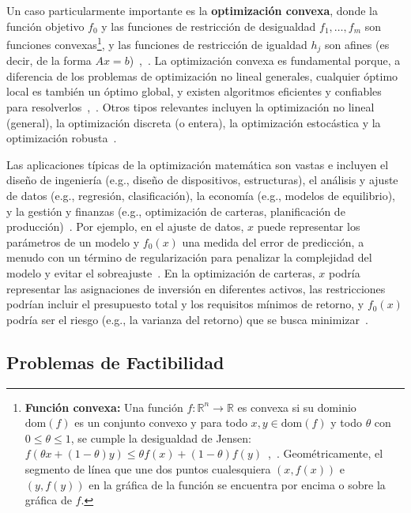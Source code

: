 Un caso particularmente importante es la \textbf{optimización convexa}, donde la función objetivo $f_0$ y las funciones
de restricción de desigualdad $f_1, \dots, f_m$ son funciones convexas\footnote{\textbf{Función convexa:} Una función
$f: \mathbb{R}^n \to \mathbb{R}$ es convexa si su dominio $\text{dom}(f)$ es un conjunto convexo y para todo $x, y \in \text{dom}(f)$
y todo $\theta$ con $0 \leq \theta \leq 1$, se cumple la desigualdad de Jensen: $f(\theta x + (1 - \theta)y) \leq \theta f(x) + (1 - \theta)f(y)$~\cite[p.~67]{BoydVandenberghe2004},~\cite[p.~46]{BoydVandenbergheSlides2023}. Geométricamente, el segmento de línea que
une dos puntos cualesquiera $(x, f(x))$ e $(y, f(y))$ en la gráfica de la función se encuentra por encima o sobre la gráfica de $f$.},
y las funciones de restricción de igualdad $h_j$ son afines (es decir, de la forma $Ax = b$)~\cite[p.~7]{BoydVandenberghe2004},~\cite[pp.~13, 95]{BoydVandenbergheSlides2023}. La optimización convexa es fundamental
porque, a diferencia de los problemas de optimización no lineal generales, cualquier óptimo local es también un óptimo global,
y existen algoritmos eficientes y confiables para resolverlos~\cite[pp.~8-9]{BoydVandenberghe2004},~\cite[pp.~10-11, 97]{BoydVandenbergheSlides2023}. Otros tipos relevantes incluyen la optimización no lineal (general),
la optimización discreta (o entera), la optimización estocástica y la optimización robusta~\cite[pp.~9-10]{BoydVandenberghe2004}.

Las aplicaciones típicas de la optimización matemática son vastas e incluyen el diseño de ingeniería (e.g., diseño de
dispositivos, estructuras), el análisis y ajuste de datos (e.g., regresión, clasificación), la economía (e.g., modelos
de equilibrio), y la gestión y finanzas (e.g., optimización de carteras, planificación de producción)~\cite[pp.~2-3]{BoydVandenberghe2004}. Por ejemplo, en el ajuste de datos, $x$ puede representar los parámetros de un
modelo y $f_0(x)$ una medida del error de predicción, a menudo con un término de regularización para penalizar la
complejidad del modelo y evitar el sobreajuste~\cite[p.~6]{BoydVandenbergheSlides2023}. En la optimización de carteras,
$x$ podría representar las asignaciones de inversión en diferentes activos, las restricciones podrían incluir el presupuesto
total y los requisitos mínimos de retorno, y $f_0(x)$ podría ser el riesgo (e.g., la varianza del retorno) que se busca
minimizar~\cite[p.~2]{BoydVandenberghe2004}.

\subsection{Problemas de Factibilidad}\label{sec:feas_problems}

